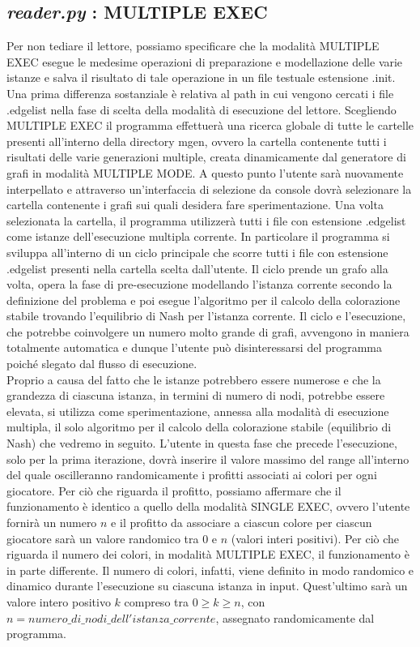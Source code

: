 \subsection{\textit{reader.py} : MULTIPLE EXEC}
\justify
Per non tediare il lettore, possiamo specificare che la modalità MULTIPLE EXEC esegue le medesime operazioni di preparazione e modellazione delle varie istanze e salva il risultato di tale operazione in un file testuale estensione .init. Una prima differenza sostanziale è relativa al path in cui vengono cercati i file .edgelist nella fase di scelta della modalità di esecuzione del lettore. Scegliendo MULTIPLE EXEC il programma effettuerà una ricerca globale di tutte le cartelle presenti all'interno della directory mgen, ovvero la cartella contenente tutti i risultati delle varie generazioni multiple, creata dinamicamente dal generatore di grafi in modalità MULTIPLE MODE. A questo punto l'utente sarà nuovamente interpellato e attraverso un'interfaccia di selezione da console dovrà selezionare la cartella contenente i grafi sui quali desidera fare sperimentazione. Una volta selezionata la cartella, il programma utilizzerà tutti i file con estensione .edgelist come istanze dell'esecuzione multipla corrente. In particolare il programma si sviluppa all'interno di un ciclo principale che scorre tutti i file con estensione .edgelist presenti nella cartella scelta dall'utente. Il ciclo prende un grafo alla volta, opera la fase di pre-esecuzione modellando l'istanza corrente secondo la definizione del problema e poi esegue l'algoritmo per il calcolo della colorazione stabile trovando l'equilibrio di Nash per l'istanza corrente. Il ciclo e l'esecuzione, che potrebbe coinvolgere un numero molto grande di grafi, avvengono in maniera totalmente automatica e dunque l'utente può disinteressarsi del programma poiché slegato dal flusso di esecuzione.\\
Proprio a causa del fatto che le istanze potrebbero essere numerose e che la grandezza di ciascuna istanza, in termini di numero di nodi, potrebbe essere elevata, si utilizza come sperimentazione, annessa alla modalità di esecuzione multipla, il solo algoritmo per il calcolo della colorazione stabile (equilibrio di Nash) che vedremo in seguito. L'utente in questa fase che precede l'esecuzione, solo per la prima iterazione, dovrà inserire il valore massimo del range all'interno del quale oscilleranno randomicamente i profitti associati ai colori per ogni giocatore. Per ciò che riguarda il profitto, possiamo affermare che il funzionamento è identico a quello della modalità SINGLE EXEC, ovvero l'utente fornirà un numero \(n\) e il profitto da associare a ciascun colore per ciascun giocatore sarà un valore randomico tra $0$ e \(n\) (valori interi positivi). Per ciò che riguarda il numero dei colori, in modalità MULTIPLE EXEC, il funzionamento è in parte differente. Il numero di colori, infatti, viene definito in modo randomico e dinamico durante l'esecuzione su ciascuna istanza in input. Quest'ultimo sarà un valore intero positivo \(k\) compreso tra \(0 \geq k \geq n\), con \(n=numero\_di\_nodi\_dell'istanza\_corrente\), assegnato randomicamente dal programma.\\
